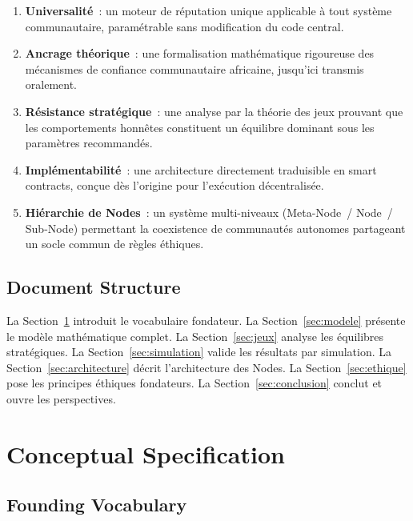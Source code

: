 \documentclass[12pt,a4paper]{article}
\theoremstyle{definition}
\theoremstyle{plain}
\theoremstyle{remark}
\newcommand{\1}{\mathbf{1}}
\begin{document}
\begin{enumerate}
  \item \textbf{Universalité}~: un moteur de réputation unique applicable à
    tout système communautaire, paramétrable sans modification du code central.

  \item \textbf{Ancrage théorique}~: une formalisation mathématique rigoureuse
    des mécanismes de confiance communautaire africaine, jusqu'ici transmis
    oralement.

  \item \textbf{Résistance stratégique}~: une analyse par la théorie des jeux
    prouvant que les comportements honnêtes constituent un équilibre dominant
    sous les paramètres recommandés.

  \item \textbf{Implémentabilité}~: une architecture directement traduisible
    en smart contracts, conçue dès l'origine pour l'exécution décentralisée.

  \item \textbf{Hiérarchie de Nodes}~: un système multi-niveaux
    (Meta-Node~/ Node~/ Sub-Node) permettant la coexistence de communautés
    autonomes partageant un socle commun de règles éthiques.
\end{enumerate}

\subsection{Document Structure}

La Section~\ref{sec:concepts} introduit le vocabulaire fondateur. La
Section~\ref{sec:modele} présente le modèle mathématique complet. La
Section~\ref{sec:jeux} analyse les équilibres stratégiques. La
Section~\ref{sec:simulation} valide les résultats par simulation. La
Section~\ref{sec:architecture} décrit l'architecture des Nodes. La
Section~\ref{sec:ethique} pose les principes éthiques fondateurs. La
Section~\ref{sec:conclusion} conclut et ouvre les perspectives.

\section{Conceptual Specification}
\label{sec:concepts}

\subsection{Founding Vocabulary}
\end{document}
